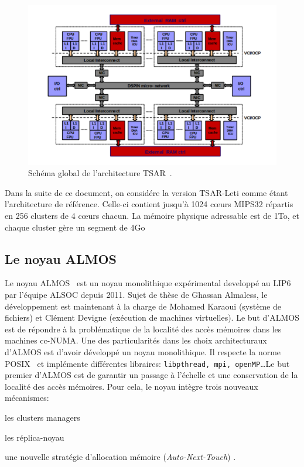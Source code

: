       \begin{figure}[ht]
        \centering \includegraphics[scale=0.25]{include/img/tsar.png}
        \caption{Schéma global de l'architecture TSAR~\citep{greiner2009tsar}.}
        \label{fig:tsar}
      \end{figure}

      Dans la suite de ce document, on considére la version TSAR-Leti comme
      étant l'architecture de référence. Celle-ci contient jusqu'à 1024 c\oe urs
      MIPS32 répartis en 256 clusters de 4 c\oe urs chacun. La mémoire physique
      adressable est de 1To, et chaque cluster gère un segment de 4Go


    \subsection{Le noyau ALMOS}
    \label{sec:almos}

      Le noyau ALMOS~\cite{almaless2011almos,almaless2014universite} est un
      noyau monolithique expérimental developpé au LIP6 par l'équipe ALSOC
      depuis 2011. Sujet de thèse de Ghassan Almaless, le développement est
      maintenant à la charge de Mohamed Karaoui (système de fichiers) et Clément
      Devigne (exécution de machines virtuelles). Le but d'ALMOS est de répondre
      à la problématique de la localité des accès mémoires dans les machines
      cc-NUMA. Une des particularités dans les choix architecturaux d'ALMOS est
      d'avoir développé un noyau monolithique. Il respecte la norme
      POSIX~\cite{posix2013} et implémente différentes libraires:
      \texttt{libpthread, mpi, openMP}\ldots Le but premier d'ALMOS est de
      garantir un passage à l'échelle et une conservation de la localité des
      accès mémoires. Pour cela, le noyau intègre trois nouveaux mécanismes:
      \benumline \item les clusters managers \item les réplica-noyau \item une
      nouvelle stratégie d'allocation mémoire (\textit{Auto-Next-Touch})
      \eenumline.


